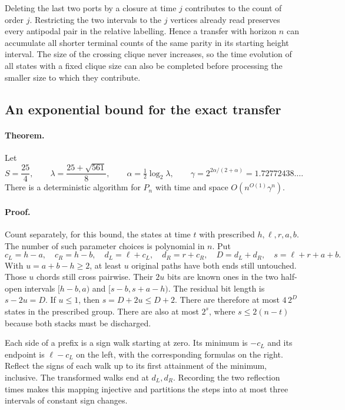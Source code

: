 Deleting the last two ports by a closure at time \(j\) contributes to the
count of order \(j\). Restricting the two intervals to the \(j\) vertices
already read preserves every antipodal pair in the relative labelling.
Hence a transfer with horizon \(n\) can accumulate all shorter terminal
counts of the same parity in its starting height interval. The size of
the crossing clique never increases, so the time evolution of all states
with a fixed clique size can also be completed before processing the
smaller size to which they contribute.

\subsection{An exponential bound for the exact transfer}
\label{sec:projective-work-bound}

\paragraph{Theorem.}
Let
\[
 S=\frac{25}{4},\qquad \lambda=\frac{25+\sqrt{561}}8,\qquad
 \alpha=\tfrac12\log_2\lambda,\qquad
 \gamma=2^{2\alpha/(2+\alpha)}=1.72772438\ldots .
\]
There is a deterministic algorithm for \(P_n\) with time and space
\(O(n^{O(1)}\gamma^n)\).

\paragraph{Proof.}
Count separately, for this bound, the states at time \(t\) with prescribed
\(h,\ell,r,a,b\). The number of such parameter choices is polynomial in
\(n\). Put
\[
 c_L=h-a,\quad c_R=h-b,\quad
 d_L=\ell+c_L,\quad d_R=r+c_R,\quad D=d_L+d_R,\quad
 s=\ell+r+a+b.
\]
With \(u=a+b-h\ge2\), at least \(u\) original paths have both ends still
untouched. Those \(u\) chords still cross pairwise. Their \(2u\) bits are
known ones in the two half-open intervals
\([h-b,a)\) and \([s-b,s+a-h)\). The residual bit length is \(s-2u=D\).
If \(u\le1\), then \(s=D+2u\le D+2\). There are therefore at most
\(4\,2^D\) states in the prescribed group. There are also at most \(2^s\),
where \(s\le2(n-t)\) because both stacks must be discharged.

Each side of a prefix is a sign walk starting at zero. Its minimum is
\(-c_L\) and its endpoint is \(\ell-c_L\) on the left, with the corresponding
formulas on the right. Reflect the signs of each walk up to its first
attainment of the minimum, inclusive. The transformed walks end at
\(d_L,d_R\). Recording the two reflection times makes this mapping
injective and partitions the steps into at most three intervals of
constant sign changes.

